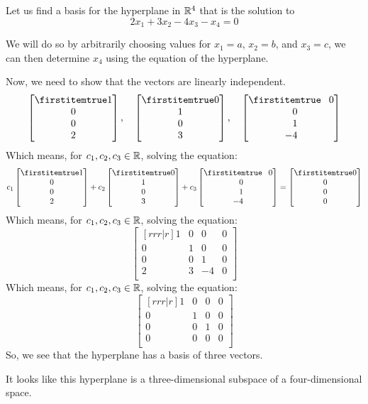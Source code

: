 \documentclass{beamer}
\begin{document}
\begin{frame}
\begin{example}
Let us find a basis for the hyperplane in $\mathbb{R}^4$ that is the solution to
\begin{equation*}
2x_1+3x_2-4x_3-x_4=0
\end{equation*}
\begin{overprint}
We will do so by arbitrarily choosing values for $x_1=a$, $x_2=b$, and $x_3=c$, we can then determine $x_4$ using the equation of the hyperplane.

Now, we need to show that the vectors are linearly independent.
\begin{equation*}
\bvector{1,0,0,2},\quad
\bvector{0,1,0,3},\quad
\bvector{\+0,\+0,\+1,-4} 
\end{equation*}
Which means, for $c_1,c_2,c_3\in\mathbb{R}$, solving the equation:
\begin{equation*}
c_1\bvector{1,0,0,2}+
c_2\bvector{0,1,0,3}+
c_3\bvector{\+0,\+0,\+1,-4}=
\bvector{0,0,0,0}
\end{equation*}
Which means, for $c_1,c_2,c_3\in\mathbb{R}$, solving the equation:
\begin{equation*}
\begin{bmatrix}[rrr|r]
1 & 0 & 0 & 0 \\
0 & 1 & 0 & 0 \\
0 & 0 & 1 & 0 \\
2 & 3 & -4 & 0 \\
\end{bmatrix}
\end{equation*}
Which means, for $c_1,c_2,c_3\in\mathbb{R}$, solving the equation:
\begin{equation*}
\begin{bmatrix}[rrr|r]
1 & 0 & 0 & 0 \\
0 & 1 & 0 & 0 \\
0 & 0 & 1 & 0 \\
0 & 0 & 0 & 0 \\
\end{bmatrix}
\end{equation*}
\vspace{1cm}
So, we see that the hyperplane has a basis of three vectors. 

\vspace{0.5cm}
It looks like this hyperplane is a three-dimensional subspace of a four-dimensional space.
\end{overprint}
\end{example}
\end{frame}
\end{document}
